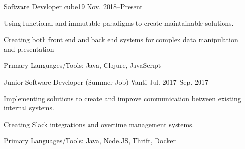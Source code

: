 

\begin{cventries}


  \cventry
    {Software Developer} %
    {cube19} %
    {} %
    {Nov. 2018--Present} %
    {
      \begin{cvmitems} %
        \item {Using functional and immutable paradigms to create maintainable
          solutions.}
        \item {Creating both front end and back end systems for complex data
          manipulation and presentation}
        \item {Primary Languages/Tools: Java, Clojure, JavaScript}
      \end{cvmitems}
    }


  \cventry
    {Junior Software Developer (Summer Job)} %
    {Vanti} %
    {} %
    {Jul. 2017--Sep. 2017} %
    {
      \begin{cvmitems} %
        \item {Implementing solutions to create and improve communication
          between existing internal systems.}
        \item {Creating Slack integrations and overtime management systems.}
        \item {Primary Languages/Tools: Java, Node.JS, Thrift, Docker}
      \end{cvmitems}
    }



\end{cventries}
